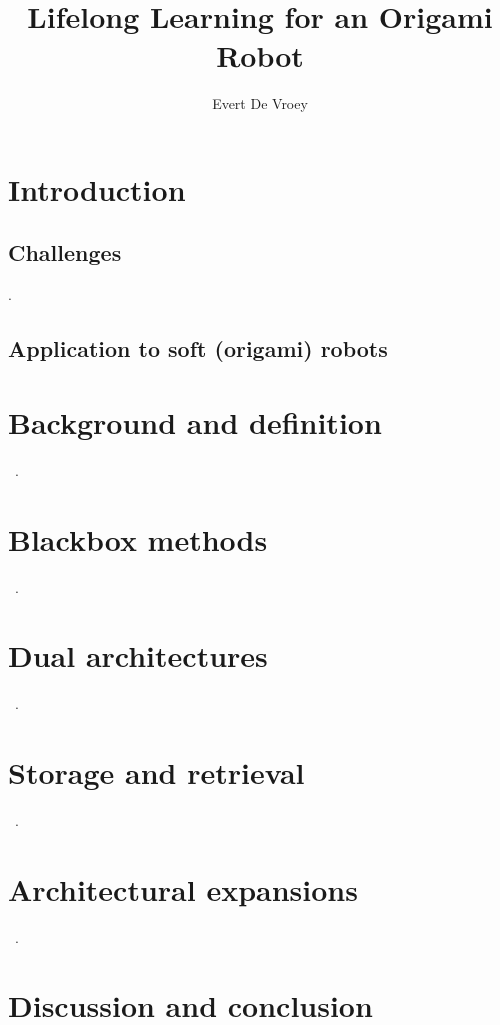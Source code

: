 \documentclass[11pt]{article}
\title{Lifelong Learning for an Origami Robot}
\author{Evert De Vroey}
\begin{document}
    \maketitle


    \section{Introduction}\label{sec:intro}

    \subsection{Challenges}\label{subsec:challenges}
    \cite{Kim2021,Lesort2020}.

    \subsection{Application to soft (origami) robots}\label{subsec:origami}


    \section{Background and definition}\label{sec:background}
    ~\cite{Lesort2020}.


    \section{Blackbox methods}\label{sec:blackbox}
    ~\cite{Zhou2022, Romeres2016, Gijsberts2011, Thuruthel2019, Nguyen2009}.


    \section{Dual architectures}\label{sec:dual}
    ~\cite{Mallya2018, Schwarz2018, Shin2017, Lu2019, Lu2020}.


    \section{Storage and retrieval}\label{sec:storage}
    ~\cite{Wang2022, Schulman2017, Mouret2015, Shin2017, Aljundi2016, Nguyen2011, Xie2021}.


    \section{Architectural expansions}\label{sec:architectural}
    ~\cite{Chatzilygeroudis2016, Nazeer2023, Gillespie2018}.


    \section{Discussion and conclusion}\label{sec:discussion}

    \printbibliography
\end{document}
